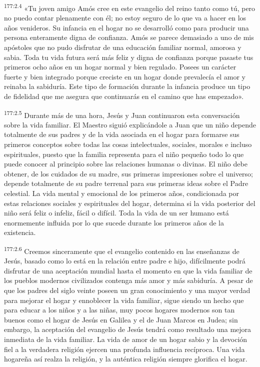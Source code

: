 \par 
\textsuperscript{177:2.4} «Tu joven amigo Amós cree en este evangelio del reino tanto como tú, pero no puedo contar plenamente con él; no estoy seguro de lo que va a hacer en los años venideros. Su infancia en el hogar no se desarrolló como para producir una persona enteramente digna de confianza. Amós se parece demasiado a uno de mis apóstoles que no pudo disfrutar de una educación familiar normal, amorosa y sabia. Toda tu vida futura será más feliz y digna de confianza porque pasaste tus primeros ocho años en un hogar normal y bien regulado. Posees un carácter fuerte y bien integrado porque creciste en un hogar donde prevalecía el amor y reinaba la sabiduría. Este tipo de formación durante la infancia produce un tipo de fidelidad que me asegura que continuarás en el camino que has empezado».

\par 
\textsuperscript{177:2.5} Durante más de una hora, Jesús y Juan continuaron esta conversación sobre la vida familiar. El Maestro siguió explicándole a Juan que un niño depende totalmente de sus padres y de la vida asociada en el hogar para formarse sus primeros conceptos sobre todas las cosas intelectuales, sociales, morales e incluso espirituales, puesto que la familia representa para el niño pequeño todo lo que puede conocer al principio sobre las relaciones humanas o divinas. El niño debe obtener, de los cuidados de su madre, sus primeras impresiones sobre el universo; depende totalmente de su padre terrenal para sus primeras ideas sobre el Padre celestial. La vida mental y emocional de los primeros años, condicionada por estas relaciones sociales y espirituales del hogar, determina si la vida posterior del niño será feliz o infeliz, fácil o difícil. Toda la vida de un ser humano está enormemente influida por lo que sucede durante los primeros años de la existencia.

\par 
\textsuperscript{177:2.6} Creemos sinceramente que el evangelio contenido en las enseñanzas de Jesús, basado como lo está en la relación entre padre e hijo, difícilmente podrá disfrutar de una aceptación mundial hasta el momento en que la vida familiar de los pueblos modernos civilizados contenga más amor y más sabiduría. A pesar de que los padres del siglo veinte poseen un gran conocimiento y una mayor verdad para mejorar el hogar y ennoblecer la vida familiar, sigue siendo un hecho que para educar a los niños y a las niñas, muy pocos hogares modernos son tan buenos como el hogar de Jesús en Galilea y el de Juan Marcos en Judea; sin embargo, la aceptación del evangelio de Jesús tendrá como resultado una mejora inmediata de la vida familiar. La vida de amor de un hogar sabio y la devoción fiel a la verdadera religión ejercen una profunda influencia recíproca. Una vida hogareña así realza la religión, y la auténtica religión siempre glorifica el hogar.

